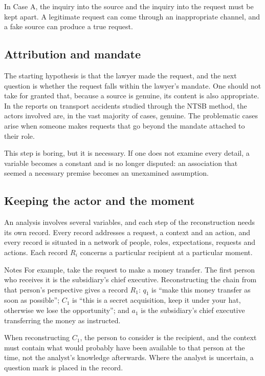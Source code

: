 In Case A, the inquiry into the source and the inquiry into the request must be kept apart. A legitimate request can come through an inappropriate channel, and a fake source can produce a true request.

\subsection{Attribution and mandate}
The starting hypothesis is that the lawyer made the request, and the next question is whether the request falls within the lawyer's mandate. One should not take for granted that, because a source is genuine, its content is also appropriate. In the reports on transport accidents studied through the NTSB method, the actors involved are, in the vast majority of cases, genuine. The problematic cases arise when someone makes requests that go beyond the mandate attached to their role.

This step is boring, but it is necessary. If one does not examine every detail, a variable becomes a constant and is no longer disputed: an association that seemed a necessary premise becomes an unexamined assumption.

\subsection{Keeping the actor and the moment}
An analysis involves several variables, and each step of the reconstruction needs its own record. Every record addresses a request, a context and an action, and every record is situated in a network of people, roles, expectations, requests and actions. Each record $R_i$ concerns a particular recipient at a particular moment.

\begin{nota}{Notes}
	For example, take the request to make a money transfer. The first person who receives it is the subsidiary's chief executive. Reconstructing the chain from that person's perspective gives a record $R_1$: $q_1$ is ``make this money transfer as soon as possible''; $C_1$ is ``this is a secret acquisition, keep it under your hat, otherwise we lose the opportunity''; and $a_1$ is the subsidiary's chief executive transferring the money as instructed.
\end{nota}

When reconstructing $C_1$, the person to consider is the recipient, and the context must contain what would probably have been available to that person at the time, not the analyst's knowledge afterwards. Where the analyst is uncertain, a question mark is placed in the record.

